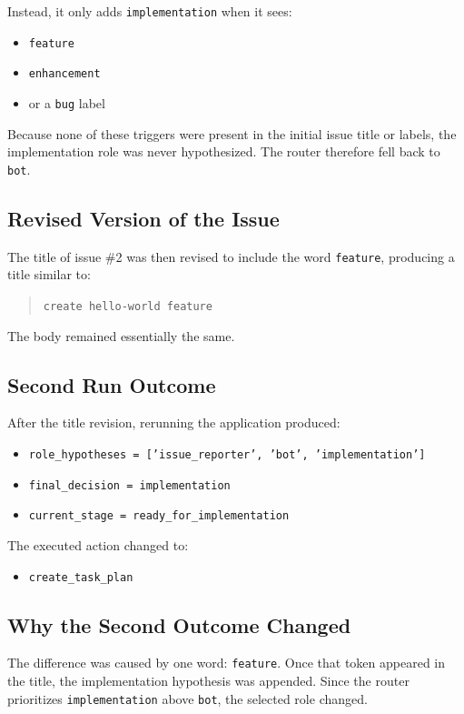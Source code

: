 \documentclass[11pt,a4paper]{article}
\begin{document}
Instead, it only adds \texttt{implementation} when it sees:
\begin{itemize}
    \item \texttt{feature}
    \item \texttt{enhancement}
    \item or a \texttt{bug} label
\end{itemize}

Because none of these triggers were present in the initial issue title or labels, the implementation role was never hypothesized. The router therefore fell back to \texttt{bot}.

\subsection{Revised Version of the Issue}

The title of issue \#2 was then revised to include the word \texttt{feature}, producing a title similar to:

\begin{quote}
\texttt{create hello-world feature}
\end{quote}

The body remained essentially the same.

\subsection{Second Run Outcome}

After the title revision, rerunning the application produced:
\begin{itemize}
    \item \texttt{role\_hypotheses = ['issue\_reporter', 'bot', 'implementation']}
    \item \texttt{final\_decision = implementation}
    \item \texttt{current\_stage = ready\_for\_implementation}
\end{itemize}

The executed action changed to:
\begin{itemize}
    \item \texttt{create\_task\_plan}
\end{itemize}

\subsection{Why the Second Outcome Changed}

The difference was caused by one word: \texttt{feature}. Once that token appeared in the title, the implementation hypothesis was appended. Since the router prioritizes \texttt{implementation} above \texttt{bot}, the selected role changed.
\end{document}
